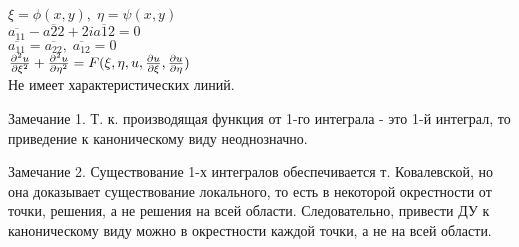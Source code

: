 \documentclass[../main.tex]{subfiles}
\begin{document}
$\xi = \phi(x,y),\; \eta = \psi(x,y)$ \\
$\overline{a_{11}} - \overline{a{22}} + 2i\overline{a{12}} = 0$ \\
$\overline{a_{11}}=\overline{a_{22}}, \; \overline{a_{12}}=0$ \\
$\frac{\partial^2u}{\partial{\xi^2}} + \frac{\partial^2u}{\partial{\eta^2}} = F(\xi, \eta, u, \frac{\partial u}{\partial \xi}, \frac{\partial u}{\partial \eta})$ \\
Не имеет характеристических линий.
\par Замечание 1. Т. к. производящая функция от 1-го интеграла - это 1-й интеграл, то приведение к каноническому виду неоднозначно.
\par Замечание 2. Существование 1-х интегралов обеспечивается т. Ковалевской, но она доказывает существование локального, то есть в некоторой окрестности от точки, решения, а не решения на всей области. Следовательно, привести ДУ к каноническому виду можно в окрестности каждой точки, а не на всей области.
\end{document}
